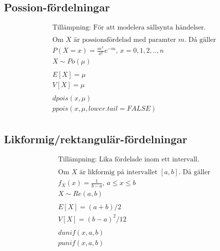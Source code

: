 \subsection{Possion-fördelningar}
\begin{align*}
  &\quad  \text{Tillämpning: För att modelera sällsynta händelser.} \\
  &\quad  \\
  &\quad  \text{Om $X$ är possionsfördelad med paramter $m$. Då gäller} \\
  &\quad  P(X=x) = \frac{m^x}{x!}e^{-m}, \, x=0,1,2,..,n  \\
  &\quad  X \sim Po(\mu) \\
  &\quad  \\
  &\quad  E[X]=\mu \\
  &\quad  V[X]=\mu \\
  &\quad  \\
  &\quad  dpois(x, \mu) \\
  &\quad  ppois(x, \mu, lower.tail = FALSE) \\
\end{align*}

\subsection{Likformig/rektangulär-fördelningar}
\begin{align*}
  &\quad  \text{Tillämpning: Lika fördelade inom ett intervall.} \\
  &\quad  \\
  &\quad  \text{Om $X$ är likformig på intervallet $[a,b]$. Då gäller} \\
  &\quad  f_X(x) = \frac{1}{b-a}, \, a\leq{x}\leq{b} \\
  &\quad  X \sim Re(a,b) \\
  &\quad  \\
  &\quad  E[X]=(a+b)/2 \\
  &\quad  V[X]=(b-a)^2/12 \\
  &\quad  \\
  &\quad  dunif(x, a, b) \\
  &\quad  punif(x, a, b) \\
\end{align*}

